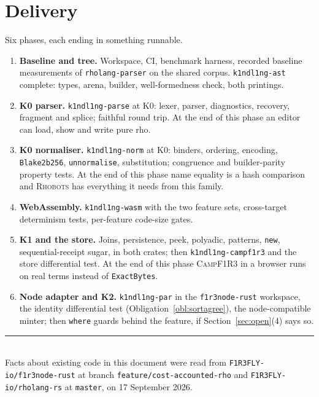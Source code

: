 \documentclass[11pt,a4paper]{article}
\newcommand{\code}[1]{\texttt{#1}}
\newcommand{\Camp}{\textsc{CampF1R3}}
\newcommand{\Rhobots}{\textsc{Rhobots}}
\theoremstyle{definition}
\theoremstyle{plain}
\begin{document}
\section{Delivery}\label{sec:delivery}

Six phases, each ending in something runnable.

\begin{enumerate}[leftmargin=1.8em,nosep]
\item \textbf{Baseline and tree.} Workspace, CI, benchmark harness, recorded
baseline measurements of \code{rholang-parser} on the shared corpus.
\code{k1ndl1ng-ast} complete: types, arena, builder, well-formedness check,
both printings.
\item \textbf{K0 parser.} \code{k1ndl1ng-parse} at K0: lexer, parser,
diagnostics, recovery, fragment and splice; faithful round trip. At the end of
this phase an editor can load, show and write pure rho.
\item \textbf{K0 normaliser.} \code{k1ndl1ng-norm} at K0: binders, ordering,
encoding, \code{Blake2b256}, \code{unnormalise}, substitution; congruence and
builder-parity property tests. At the end of this phase name equality is a hash
comparison and \Rhobots{} has everything it needs from this family.
\item \textbf{WebAssembly.} \code{k1ndl1ng-wasm} with the two feature sets,
cross-target determinism tests, per-feature code-size gates.
\item \textbf{K1 and the store.} Joins, persistence, peek, polyadic, patterns,
\code{new}, sequential-receipt sugar, in both crates; then
\code{k1ndl1ng-campf1r3} and the store differential test. At the end of this
phase \Camp{} in a browser runs on real terms instead of \code{ExactBytes}.
\item \textbf{Node adapter and K2.} \code{k1ndl1ng-par} in the
\code{f1r3node-rust} workspace, the identity differential test
(Obligation~\ref{obl:sortagree}), the node-compatible minter; then \code{where}
guards behind the feature, if Section~\ref{sec:open}(4) says so.
\end{enumerate}

\vfill
\noindent\rule{\linewidth}{0.4pt}\\[2pt]
\footnotesize
Facts about existing code in this document were read from
\code{F1R3FLY-io/f1r3node-rust} at branch \code{feature/cost-accounted-rho} and
\code{F1R3FLY-io/rholang-rs} at \code{master}, on 17 September 2026.
\end{document}
